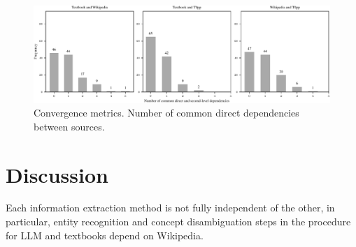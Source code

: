 \documentclass{article}
\begin{document}

\begin{figure}
    \centering
    \includegraphics[width=.95\textwidth]{img/comp_direct_deps.pdf}
    \caption{Convergence metrics. Number of common direct dependencies between sources.}
    \label{fig:comp_direct_deps}
\end{figure}

\section{Discussion}





Each information extraction method is not fully independent of the other, in particular, entity recognition and concept disambiguation steps in the procedure for LLM and textbooks depend on Wikipedia.




\end{document}
